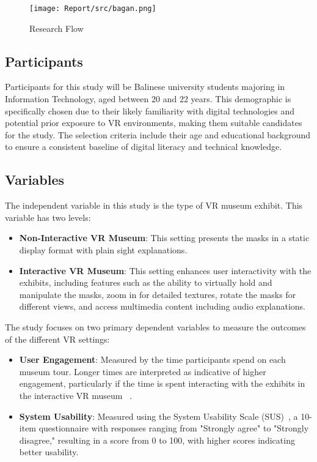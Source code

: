 \documentclass[conference]{IEEEtran}
\begin{document}
\begin{figure}[htbp]
    \centering
    \texttt{[image: Report/src/bagan.png]}
    \caption{Research Flow}
    \label{fig:researchflowchart}
\end{figure}



\subsection{Participants}
Participants for this study will be Balinese university students majoring in Information Technology, aged between 20 and 22 years. This demographic is specifically chosen due to their likely familiarity with digital technologies and potential prior exposure to VR environments, making them suitable candidates for the study. The selection criteria include their age and educational background to ensure a consistent baseline of digital literacy and technical knowledge.

\subsection{Variables}
The independent variable in this study is the type of VR museum exhibit. This variable has two levels:

\begin{itemize}
    \item \textbf{Non-Interactive VR Museum}: This setting presents the masks in a static display format with plain sight explanations.
    \item \textbf{Interactive VR Museum}: This setting enhances user interactivity with the exhibits, including features such as the ability to virtually hold and manipulate the masks, zoom in for detailed textures, rotate the masks for different views, and access multimedia content including audio explanations.
\end{itemize}

The study focuses on two primary dependent variables to measure the outcomes of the different VR settings:

\begin{itemize}
    \item \textbf{User Engagement}: Measured by the time participants spend on each museum tour. Longer times are interpreted as indicative of higher engagement, particularly if the time is spent interacting with the exhibits in the interactive VR museum ~\cite{read2021engagement}.
    \item \textbf{System Usability}: Measured using the System Usability Scale (SUS)~\cite{vlachogianni2022perceived}, a 10-item questionnaire with responses ranging from "Strongly agree" to "Strongly disagree," resulting in a score from 0 to 100, with higher scores indicating better usability.
\end{itemize}
\end{document}
